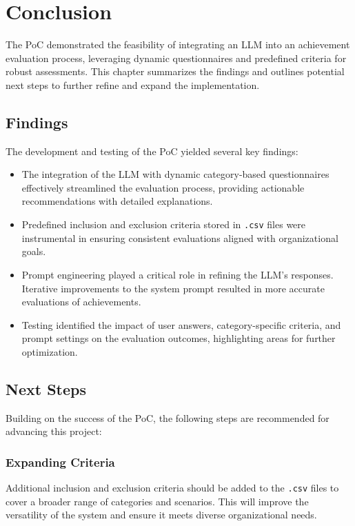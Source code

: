 \chapter{Conclusion}
\label{conclusion}

The \ac{PoC} demonstrated the feasibility of integrating an \ac{LLM} into an achievement evaluation process, leveraging dynamic questionnaires and predefined criteria for robust assessments. 
This chapter summarizes the findings and outlines potential next steps to further refine and expand the implementation.

\section{Findings}
The development and testing of the \ac{PoC} yielded several key findings:
\begin{itemize}
    \item The integration of the \ac{LLM} with dynamic category-based questionnaires effectively streamlined the evaluation process, providing actionable recommendations with detailed explanations.
    \item Predefined inclusion and exclusion criteria stored in \texttt{.csv} files were instrumental in ensuring consistent evaluations aligned with organizational goals.
    \item Prompt engineering played a critical role in refining the \ac{LLM}'s responses. Iterative improvements to the system prompt resulted in more accurate evaluations of achievements.
    \item Testing identified the impact of user answers, category-specific criteria, and prompt settings on the evaluation outcomes, highlighting areas for further optimization.
\end{itemize}

\section{Next Steps}
Building on the success of the \ac{PoC}, the following steps are recommended for advancing this project:

\subsection*{Expanding Criteria}
Additional inclusion and exclusion criteria should be added to the \texttt{.csv} files to cover a broader range of categories and scenarios. 
This will improve the versatility of the system and ensure it meets diverse organizational needs.

